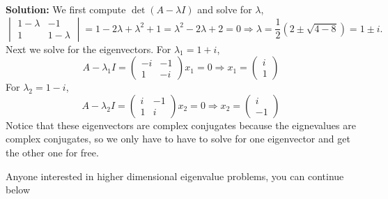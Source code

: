 \documentclass[reqno]{amsart}
\theoremstyle{definition}
\begin{document}
\begin{enumerate}
\textbf{Solution:  }  We first compute $\det(A-\lambda I)$ and solve for $\lambda$,
%
\begin{equation*}
\begin{vmatrix}
1 - \lambda & -1\\
1 & 1-\lambda
\end{vmatrix} = 1 - 2\lambda + \lambda^2 + 1 = \lambda^2 - 2\lambda + 2 = 0
\Rightarrow \lambda = \frac{1}{2}\left(2 \pm \sqrt{4 - 8}\right) = 1\pm i.
\end{equation*}
%
Next we solve for the eigenvectors.  For $\lambda_1 = 1 + i$,
%
\begin{equation*}
A - \lambda_1I = \begin{pmatrix}
-i & -1\\
1 & -i
\end{pmatrix}x_1 = 0 \Rightarrow x_1 = \begin{pmatrix}
i\\
1
\end{pmatrix}
\end{equation*}
%
For $\lambda_2 = 1 - i$,
%
\begin{equation*}
A - \lambda_2I = \begin{pmatrix}
i & -1\\
1 & i
\end{pmatrix}x_2 = 0 \Rightarrow x_2 = \begin{pmatrix}
i\\
-1
\end{pmatrix}
\end{equation*}
%
Notice that these eigenvectors are complex conjugates because the eignevalues are complex conjugates, so we only have to have to solve for one eigenvector and get the other one for free.

\end{enumerate}

\pagebreak

Anyone interested in higher dimensional eigenvalue problems, you can continue below
\end{document}
